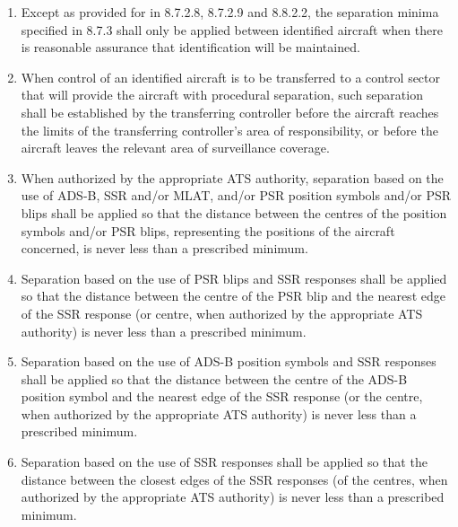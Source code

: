 
\begin{enumerate}
    \item Except as provided for in 8.7.2.8, 8.7.2.9 and 8.8.2.2, the separation minima specified in 8.7.3 shall only be applied between identified aircraft when there is reasonable assurance that identification will be maintained.
    \item When control of an identified aircraft is to be transferred to a control sector that will provide the aircraft with procedural separation, such separation shall be established by the transferring controller before the aircraft reaches the limits of the transferring controller’s area of responsibility, or before the aircraft leaves the relevant area of surveillance coverage.
    \item When authorized by the appropriate ATS authority, separation based on the use of ADS-B, SSR and/or MLAT, and/or PSR position symbols and/or PSR blips shall be applied so that the distance between the centres of the position symbols and/or PSR blips, representing the positions of the aircraft concerned, is never less than a prescribed minimum.
    \item Separation based on the use of PSR blips and SSR responses shall be applied so that the distance between the centre of the PSR blip and the nearest edge of the SSR response (or centre, when authorized by the appropriate ATS authority) is never less than a prescribed minimum.
    \item Separation based on the use of ADS-B position symbols and SSR responses shall be applied so that the distance between the centre of the ADS-B position symbol and the nearest edge of the SSR response (or the centre, when authorized by the appropriate ATS authority) is never less than a prescribed minimum.
    \item Separation based on the use of SSR responses shall be applied so that the distance between the closest edges of the SSR responses (of the centres, when authorized by the appropriate ATS authority) is never less than a prescribed minimum.

\end{enumerate}

